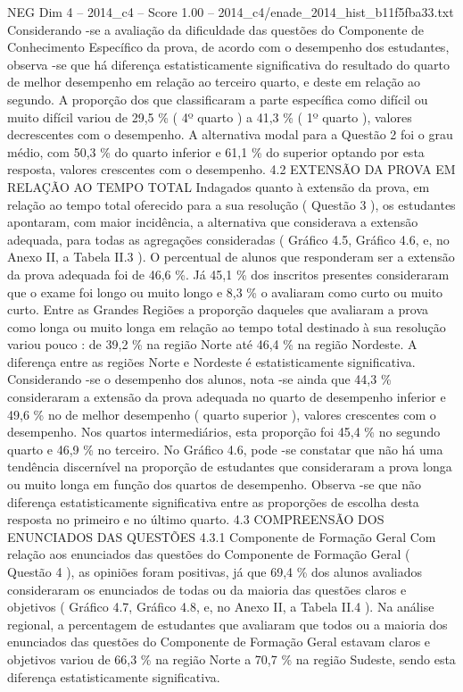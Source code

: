 \begin{textsample}{NEG Dim 4 – 2014\_c4 – Score 1.00 – 2014\_c4/enade\_2014\_hist\_b11f5fba33.txt}
Considerando -se a avaliação da dificuldade das questões do Componente de Conhecimento Específico da prova, de acordo com o desempenho dos estudantes, observa -se que há diferença estatisticamente significativa do resultado do quarto de melhor desempenho em relação ao terceiro quarto, e deste em relação ao segundo.
A proporção dos que classificaram a parte específica como difícil ou muito difícil variou de 29,5 \% ( 4º quarto ) a 41,3 \% ( 1º quarto ), valores decrescentes com o desempenho.
A alternativa modal para a Questão 2 foi o grau médio, com 50,3 \% do quarto inferior e 61,1 \% do superior optando por esta resposta, valores crescentes com o desempenho. 4.2 EXTENSÃO DA PROVA EM RELAÇÃO AO TEMPO TOTAL Indagados quanto à extensão da prova, em relação ao tempo total oferecido para a sua resolução ( Questão 3 ), os estudantes apontaram, com maior incidência, a alternativa que considerava a extensão adequada, para todas as agregações consideradas ( Gráfico 4.5, Gráfico 4.6, e, no Anexo II, a Tabela II.3 ).
O percentual de alunos que responderam ser a extensão da prova adequada foi de 46,6 \%.
Já 45,1 \% dos inscritos presentes consideraram que o exame foi longo ou muito longo e 8,3 \% o avaliaram como curto ou muito curto.
Entre as Grandes Regiões a proporção daqueles que avaliaram a prova como longa ou muito longa em relação ao tempo total destinado à sua resolução variou pouco : de 39,2 \% na região Norte até 46,4 \% na região Nordeste.
A diferença entre as regiões Norte e Nordeste é estatisticamente significativa.
Considerando -se o desempenho dos alunos, nota -se ainda que 44,3 \% consideraram a extensão da prova adequada no quarto de desempenho inferior e 49,6 \% no de melhor desempenho ( quarto superior ), valores crescentes com o desempenho.
Nos quartos intermediários, esta proporção foi 45,4 \% no segundo quarto e 46,9 \% no terceiro.
No Gráfico 4.6, pode -se constatar que não há uma tendência discernível na proporção de estudantes que consideraram a prova longa ou muito longa em função dos quartos de desempenho.
Observa -se que não diferença estatisticamente significativa entre as proporções de escolha desta resposta no primeiro e no último quarto. 4.3 COMPREENSÃO DOS ENUNCIADOS DAS QUESTÕES 4.3.1 Componente de Formação Geral Com relação aos enunciados das questões do Componente de Formação Geral ( Questão 4 ), as opiniões foram positivas, já que 69,4 \% dos alunos avaliados consideraram os enunciados de todas ou da maioria das questões claros e objetivos ( Gráfico 4.7, Gráfico 4.8, e, no Anexo II, a Tabela II.4 ).
Na análise regional, a percentagem de estudantes que avaliaram que todos ou a maioria dos enunciados das questões do Componente de Formação Geral estavam claros e objetivos variou de 66,3 \% na região Norte a 70,7 \% na região Sudeste, sendo esta diferença estatisticamente significativa.

\end{textsample}
